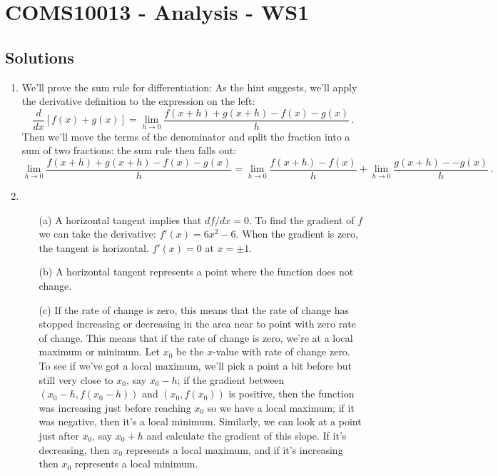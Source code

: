 \documentclass[11pt,a4paper]{scrartcl}
\begin{document}
\section*{COMS10013 - Analysis - WS1}

\subsection*{Solutions}

\begin{enumerate}
\item We'll prove the sum rule for differentiation:
As the hint suggests, we'll apply the derivative definition to the expression on the left:
\[
\frac{d}{dx}\left[f(x) + g(x)\right] = \lim_{h\to 0}\frac{f(x+h)+g(x+h)-f(x)-g(x)}{h}\,.
\]
Then we'll move the terms of the denominator and split the fraction into a sum of two fractions: the sum rule then falls out:
\[
\lim_{h\to 0}\frac{f(x+h)+g(x+h)-f(x)-g(x)}{h} = \lim_{h\to 0}\frac{f(x+h)-f(x)}{h}+ \lim_{h\to 0}\frac{g(x+h)--g(x)}{h}\,.
\]

\item 
\begin{enumerate}
    \item[(a)] A horizontal tangent implies that $df/dx=0$. 
    To find the gradient of $f$ we can take the derivative: $f'(x) = 6x^2 -6$. When the gradient is zero, the tangent is horizontal. $f'(x) =0$ at $x = \pm 1$.
    \item[(b)] A horizontal tangent represents a point where the function does not change.  
    \item[(c)] If the rate of change is zero, this means that the rate of change has stopped increasing or decreasing in the area near to point with zero rate of change. This means that if the rate of change is zero, we're at a local maximum or minimum. Let $x_0$ be the $x$-value with rate of change zero. To see if we've got a local maximum, we'll pick a point a bit before but still very close to $x_0$, say $x_0 -h$; if the gradient between $(x_0-h, f(x_0-h))$ and $(x_0, f(x_0))$ is positive, then the function was increasing just before reaching $x_0$ so we have a local maximum; if it was negative, then it's a local minimum. Similarly, we can look at a point just after $x_0$, say $x_0 + h$ and calculate the gradient of this slope. If it's decreasing, then $x_0$ represents a local maximum, and if it's increasing then $x_0$ represents a local minimum. 
\end{enumerate}


\end{enumerate}
\end{document}
